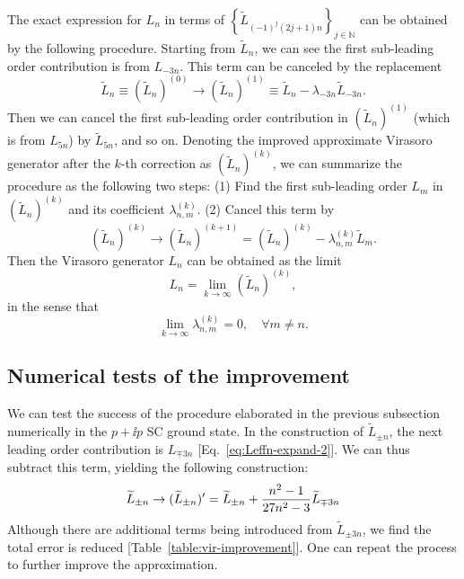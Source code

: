 \documentclass[12pt, nofootinbib]{article}
\theoremstyle{plain}
\theoremstyle{assumption}
\theoremstyle{definition}
\theoremstyle{plain}
\theoremstyle{plain}
\theoremstyle{plain}
\theoremstyle{plain}
\theoremstyle{plain}
\def\Leff{\widetilde{L}}
\begin{document}
The exact expression for $L_n$ in terms of $\left\{ \Leff_{(-1)^j(2j+1)n}\right\}_{j\in\mathbb{N}}$ can be obtained by the following procedure. Starting from $\Leff_n$, we can see the first sub-leading order contribution is from $L_{-3n}$. This term can be canceled by the replacement
\begin{equation}
    \Leff_{n} \equiv(\Leff_{n})^{(0)} \to (\Leff_{n})^{(1)}
    \equiv \Leff_{n} - \lambda_{-3n}\Leff_{-3n}. 
\end{equation}
Then we can cancel the first sub-leading order contribution in $(\Leff_n)^{(1)}$ (which is from $L_{5n}$) by $\Leff_{5n}$, and so on. Denoting the improved approximate Virasoro generator after the $k$-th correction as $(\Leff_n)^{(k)}$, we can summarize the procedure as the following two steps: (1) Find the first sub-leading order $L_m$ in $(\Leff_n)^{(k)}$ and its coefficient $\lambda^{(k)}_{n,m}$. (2) Cancel this term by 
\begin{equation}
    (\Leff_n)^{(k)} \to (\Leff_n)^{(k+1)} = (\Leff_n)^{(k)} - \lambda^{(k)}_{n,m}\Leff_m. 
\end{equation}
Then the Virasoro generator $L_n$ can be obtained as the limit
\begin{equation}\label{eq:Ln-Leffn}
    L_n = \lim_{k\to\infty}(\Leff_n)^{(k)}, 
\end{equation}
in the sense that 
\begin{equation}\label{eq:lim-lambda-nm}
    \lim_{k\to\infty} \lambda_{n,m}^{(k)} = 0,\quad \forall m\neq n. 
\end{equation}

\subsection{Numerical tests of the improvement}
We can test the success of the procedure elaborated in the previous subsection numerically in the $p+\ii p$ SC ground state.  
In the construction of $\Leff_{\pm n}$, the next leading order contribution is $L_{\mp 3n}$ [Eq.~\eqref{eq:Leffn-expand-2}]. We can thus subtract this term, yielding the following construction: 
\begin{equation}
    \Leff_{\pm n} \to (\Leff_{\pm n})' = \Leff_{\pm n} + \frac{n^2-1}{27n^2-3}\Leff_{\mp 3n} \\ 
\end{equation}
Although there are additional terms being introduced from $\Leff_{\pm 3n}$, we find the total error is reduced [Table~\ref{table:vir-improvement}]. One can repeat the process to further improve the approximation. 
\end{document}

